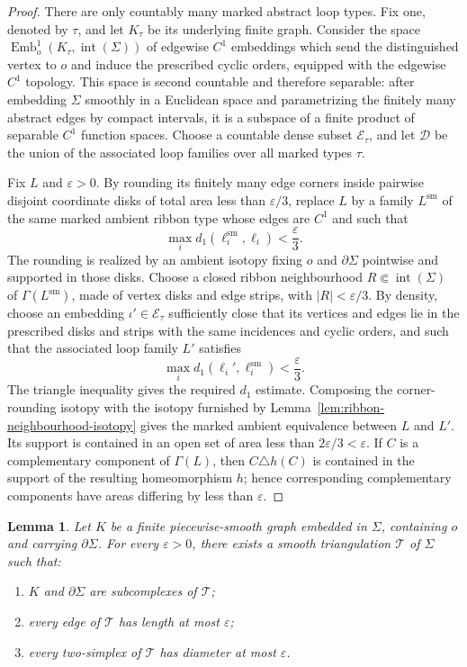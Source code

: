 \documentclass[11pt,a4paper,reqno]{article}
\newtheorem{lemma}[theorem]{Lemma}
\theoremstyle{definition}
\theoremstyle{remark}
\begin{document}
\begin{proof}
There are only countably many marked abstract loop types. Fix one, denoted by $\tau$, and let $K_\tau$ be its underlying finite graph. Consider the space $\operatorname{Emb}_o^1(K_\tau,\operatorname{int}(\Sigma))$ of edgewise $C^1$ embeddings which send the distinguished vertex to $o$ and induce the prescribed cyclic orders, equipped with the edgewise $C^1$ topology. This space is second countable and therefore separable: after embedding $\Sigma$ smoothly in a Euclidean space and parametrizing the finitely many abstract edges by compact intervals, it is a subspace of a finite product of separable $C^1$ function spaces. Choose a countable dense subset $\mathscr E_\tau$, and let $\mathscr D$ be the union of the associated loop families over all marked types $\tau$.

Fix $L$ and $\varepsilon>0$. By rounding its finitely many edge corners inside pairwise disjoint coordinate disks of total area less than $\varepsilon/3$, replace $L$ by a family $L^{\mathrm{sm}}$ of the same marked ambient ribbon type whose edges are $C^1$ and such that
\[
 \max_i d_1(\ell_i^{\mathrm{sm}},\ell_i)<\frac{\varepsilon}{3}.
\]
The rounding is realized by an ambient isotopy fixing $o$ and $\partial\Sigma$ pointwise and supported in those disks. Choose a closed ribbon neighbourhood $R\Subset\operatorname{int}(\Sigma)$ of $\Gamma(L^{\mathrm{sm}})$, made of vertex disks and edge strips, with $|R|<\varepsilon/3$. By density, choose an embedding $\iota'\in\mathscr E_\tau$ sufficiently close that its vertices and edges lie in the prescribed disks and strips with the same incidences and cyclic orders, and such that the associated loop family $L'$ satisfies
\[
 \max_i d_1(\ell_i',\ell_i^{\mathrm{sm}})<\frac{\varepsilon}{3}.
\]
The triangle inequality gives the required $d_1$ estimate. Composing the corner-rounding isotopy with the isotopy furnished by Lemma~\ref{lem:ribbon-neighbourhood-isotopy} gives the marked ambient equivalence between $L$ and $L'$. Its support is contained in an open set of area less than $2\varepsilon/3<\varepsilon$. If $C$ is a complementary component of $\Gamma(L)$, then $C\triangle h(C)$ is contained in the support of the resulting homeomorphism $h$; hence corresponding complementary components have areas differing by less than $\varepsilon$.
\end{proof}

\begin{lemma}\label{lem:fine-relative-triangulation}
Let $K$ be a finite piecewise-smooth graph embedded in $\Sigma$, containing $o$ and carrying $\partial\Sigma$. For every $\varepsilon>0$, there exists a smooth triangulation $\mathcal T$ of $\Sigma$ such that:
\begin{enumerate}
\item $K$ and $\partial\Sigma$ are subcomplexes of $\mathcal T$;
\item every edge of $\mathcal T$ has length at most $\varepsilon$;
\item every two-simplex of $\mathcal T$ has diameter at most $\varepsilon$.
\end{enumerate}
\end{lemma}
\end{document}
